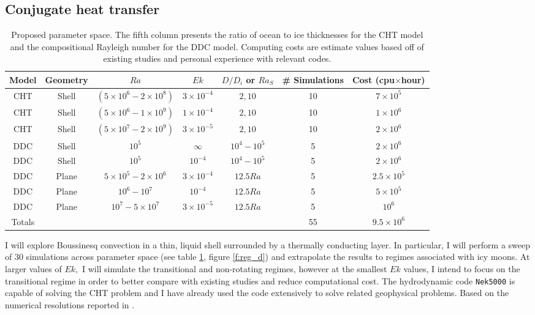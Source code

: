 \documentclass{article}
\def\lb{\left(}
\def\rb{\right)}
\begin{document}
\subsection{Conjugate heat transfer}
\begin{table}
\begin{center}
\begin{tabular}{|c|c|c|c|c|c|c|}
\hline
Model&Geometry&$Ra$&$Ek$&$D/D_{i}$ or $Ra_S$ &\# Simulations & Cost (cpu$\times$hour)\\
\hline
CHT& Shell&$\lb 5 \times 10^{6} - 2 \times 10^{8} \rb $ & $3 \times 10^{-4} $ & $2,10$&10&$7 \times 10^{5}$\\
\hline
CHT& Shell&$\lb 5 \times 10^{6} - 1 \times 10^{9} \rb $ & $1 \times 10^{-4} $ & $2,10$&10&$1\times 10^{6}$\\
\hline
CHT& Shell&$\lb 5 \times 10^{7} - 2 \times 10^{9} \rb $ & $3 \times 10^{-5} $ & $2,10$&10&$2\times 10^6$\\
\hline
DDC& Shell & $10^5$& $\infty$&$10^4-10^5$& 5& $2\times 10^{6}$\\
\hline
DDC& Shell & $10^5$& $10^{-4}$&$10^4-10^5$& 5& $2\times 10^{6}$\\
\hline
DDC& Plane &$5\times10^{5}-2\times10^{6}$ & $3\times10^{-4}$&$12.5Ra$ &5 &$2.5\times 10^{5}$  \\
\hline
DDC& Plane &$10^{6}-10^{7}$ & $10^{-4}$&$12.5Ra$& 5 & $5\times 10^{5}$\\
\hline
DDC& Plane &$10^{7}-5\times 10^{7}$ & $3\times10^{-5}$&$12.5Ra$ & 5& $10^{6}$ \\
\hline
Totals & & & & & 55&$9.5 \times 10^6$ \\
\hline
\end{tabular}
\end{center}
\caption{Proposed parameter space. The fifth column presents the ratio of ocean to ice thicknesses for the CHT model and the compositional Rayleigh number for the DDC model. 
Computing costs are estimate values based off of existing studies \citep{rM19,rM17,dL23,jF24} and personal experience with relevant codes.}
\label{t:param}
\end{table}
I will explore Boussinesq convection in a thin, liquid shell surrounded by a thermally conducting layer. 
In particular, I will perform a sweep of $30$ simulations across parameter space (see table \ref{t:param}, figure \ref{f:reg_d}) and extrapolate the results to regimes associated with icy moons.
At larger values of $Ek,$ I will simulate the transitional and non-rotating regimes, however at the smallest $Ek$ values, I intend to focus on the transitional regime in order to better compare with existing studies and reduce computational cost.
The hydrodynamic code \texttt{Nek5000}\citep{nek5000} is capable of solving the CHT problem and I have already used the code extensively to solve related geophysical problems. 
Based on the numerical resolutions reported in \citep{dL23}.
\end{document}
